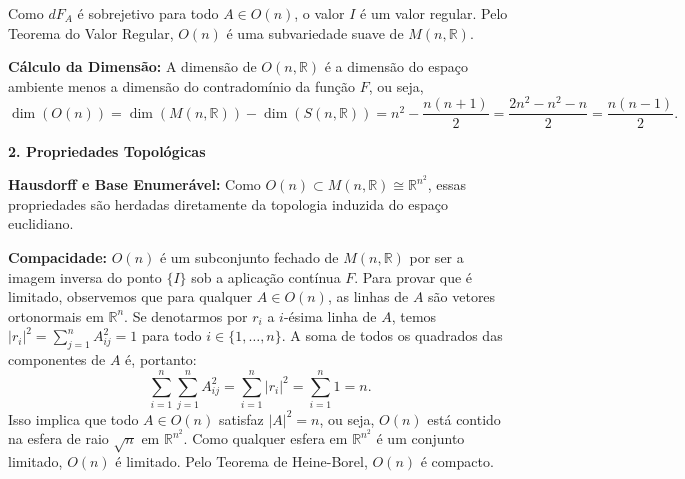 {	Como $dF_A$ é sobrejetivo para todo $A \in O(n)$, o valor $I$ é um valor regular. Pelo Teorema do Valor Regular, $O(n)$ é uma subvariedade suave de $M(n, \mathbb{R})$.
	
	\textbf{Cálculo da Dimensão: }A dimensão de $O(n, \mathbb{R})$ é a dimensão do espaço ambiente menos a dimensão do contradomínio da função $F$, ou seja, 
	$$\dim(O(n)) = \dim(M(n, \mathbb{R})) - \dim(S(n, \mathbb{R})) = n^2 - \frac{n(n+1)}{2} = \frac{2n^2 - n^2 - n}{2} = \frac{n(n-1)}{2}.$$
	
	\textbf{2. Propriedades Topológicas}
	
	\textbf{Hausdorff e Base Enumerável:} Como $O(n) \subset M(n, \mathbb{R}) \cong \mathbb{R}^{n^2}$, essas propriedades são herdadas diretamente da topologia induzida do espaço euclidiano.
	
	\textbf{Compacidade:} $O(n)$ é um subconjunto fechado de $M(n, \mathbb{R})$ por ser a imagem inversa do ponto $\{I\}$ sob a aplicação contínua $F$. Para provar que é limitado, observemos que para qualquer $A \in O(n)$, as linhas de $A$ são vetores ortonormais em $\mathbb{R}^n$. Se denotarmos por $r_i$ a $i$-ésima linha de $A$, temos $|r_i|^2 = \sum_{j=1}^n A_{ij}^2 = 1$ para todo $i \in \{1, \dots, n\}$. A soma de todos os quadrados das componentes de $A$ é, portanto:
	\[ \sum_{i=1}^n \sum_{j=1}^n A_{ij}^2 = \sum_{i=1}^n |r_i|^2 = \sum_{i=1}^n 1 = n. \]
	Isso implica que todo $A \in O(n)$ satisfaz $|A|^2 = n$, ou seja, $O(n)$ está contido na esfera de raio $\sqrt{n}$ em $\mathbb{R}^{n^2}$. Como qualquer esfera em $\mathbb{R}^{n^2}$ é um conjunto limitado, $O(n)$ é limitado. Pelo Teorema de Heine-Borel, $O(n)$ é compacto.
}
